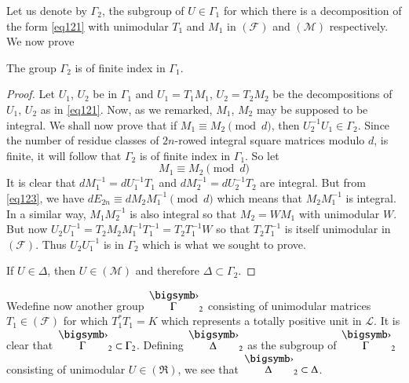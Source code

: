 Let us denote by $\Gamma_{2}$, the subgroup of $U\in\Gamma_{1}$ for
which there is a decomposition of the form \eqref{eq121} with unimodular
$T_{1}$ and $M_{1}$ in $(\mathscr{F})$ and $(\mathscr{M})$
respectively. We now prove

\begin{proposition}\label{prop18}
The group $\Gamma_{2}$ is of finite index in $\Gamma_{1}$.
\end{proposition}

\begin{proof}
Let $U_{1}$, $U_{2}$ be in $\Gamma_{1}$ and $U_{1}=T_{1}M_{1}$,
$U_{2}=T_{2}M_{2}$ be the decompositions of $U_{1}$, $U_{2}$ as in
\eqref{eq121}. Now, as we remarked, $M_{1}$, $M_{2}$ may be supposed to
be integral. We shall now prove that if $M_{1}\equiv M_{2}\pmod{d}$,
then $U^{-1}_{2}U_{1}\in\Gamma_{2}$. Since the number of residue
classes of $2n$-rowed integral square matrices modulo $d$, is finite,
it will follow that $\Gamma_{2}$ is of finite index in
$\Gamma_{1}$. So let 
\begin{equation*}
M_{1}\equiv M_{2}\pmod{d}\tag{123}\label{eq123}
\end{equation*}
It is clear that $dM^{-1}_{1}=dU^{-1}_{1}T_{1}$ and
$dM^{-1}_{2}=dU^{-1}_{2}T_{2}$ are integral. But from \eqref{eq123}, we
have $dE_{2n}\equiv dM_{2}M^{-1}_{1}\pmod{d}$ which means that
$M_{2}M^{-1}_{1}$ is integral. In a similar way, $M_{1}M^{-1}_{2}$ is
also integral so that $M_{2}=WM_{1}$ with unimodular $W$. But now
$U_{2}U^{-1}_{1}=T_{2}M_{2}M^{-1}_{1}T^{-1}_{1}=T_{2}T^{-1}_{1}W$ so
that $T_{2}T^{-1}_{1}$ is itself unimodular in $(\mathscr{F})$. Thus
$U_{2}U^{-1}_{1}$ is in $\Gamma_{2}$ which is what we sought to prove.

If $U\in\Delta$, then $U\in(\mathscr{M})$ and therefore $\Delta\subset
\Gamma_{2}$. 
\end{proof}

We\pageoriginale define now another group $\overdot{\Gamma}_{2}$
consisting of unimodular matrices $T_{1}\in(\mathscr{F})$ for which
$T^{\ast}_{1}T_{1}=K$ which represents a totally positive unit in
$\mathscr{L}$. It is clear that $\overdot{\Gamma}_{2}\subset
\Gamma_{2}$. Defining $\overdot{\Delta}_{2}$ as the subgroup of
$\overdot{\Gamma}_{2}$ consisting of unimodular $U\in(\mathfrak{R})$,
we see that $\overdot{\Delta}_{2}\subset \Delta$.

